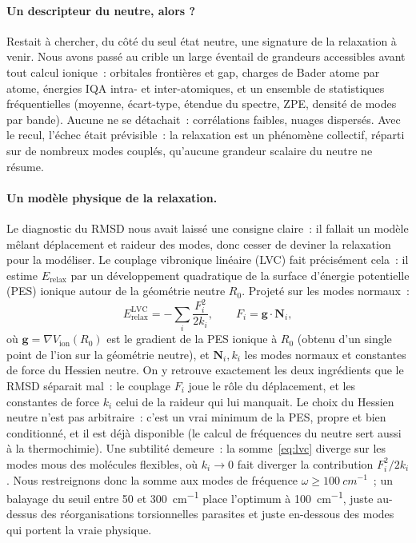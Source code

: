\paragraph{Un descripteur du neutre, alors ?}
Restait à chercher, du côté du seul état neutre, une signature de la relaxation à venir. Nous avons passé au crible un large éventail de grandeurs accessibles avant tout calcul ionique~: orbitales frontières et gap, charges de Bader\cite{bader1990} atome par atome, énergies IQA intra- et inter-atomiques, et un ensemble de statistiques fréquentielles (moyenne, écart-type, étendue du spectre, ZPE, densité de modes par bande). Aucune ne se détachait~: corrélations faibles, nuages dispersés. Avec le recul, l'échec était prévisible~: la relaxation est un phénomène collectif, réparti sur de nombreux modes couplés, qu'aucune grandeur scalaire du neutre ne résume.

\paragraph{Un modèle physique de la relaxation.}
Le diagnostic du RMSD nous avait laissé une consigne claire~: il fallait un modèle mêlant déplacement et raideur des modes, donc cesser de deviner la relaxation pour la modéliser. Le couplage vibronique linéaire (LVC)\cite{koppel1984} fait précisément cela~: il estime $E_{\text{relax}}$ par un développement quadratique de la surface d'énergie potentielle (PES) ionique autour de la géométrie neutre $R_0$. Projeté sur les modes normaux~:
\begin{equation}
E_{\text{relax}}^{\text{LVC}} = -\sum_i \frac{F_i^2}{2k_i}, \qquad F_i = \boldsymbol{g}\cdot\mathbf{N}_i,
\label{eq:lvc}
\end{equation}
où $\boldsymbol{g} = \nabla V_{\text{ion}}(R_0)$ est le gradient de la PES ionique à $R_0$ (obtenu d'un single point de l'ion sur la géométrie neutre), et $\mathbf{N}_i, k_i$ les modes normaux et constantes de force du Hessien neutre. On y retrouve exactement les deux ingrédients que le RMSD séparait mal~: le couplage $F_i$ joue le rôle du déplacement, et les constantes de force $k_i$ celui de la raideur qui lui manquait. Le choix du Hessien neutre n'est pas arbitraire~: c'est un vrai minimum de la PES, propre et bien conditionné, et il est déjà disponible (le calcul de fréquences du neutre sert aussi à la thermochimie). Une subtilité demeure~: la somme~\eqref{eq:lvc} diverge sur les modes mous des molécules flexibles, où $k_i \to 0$ fait diverger la contribution $F_i^2/2k_i$. Nous restreignons donc la somme aux modes de fréquence $\omega \geq \SI{100}{cm^{-1}}$~; un balayage du seuil entre 50 et \SI{300}{cm^{-1}} place l'optimum à \SI{100}{cm^{-1}}, juste au-dessus des réorganisations torsionnelles parasites et juste en-dessous des modes qui portent la vraie physique.

